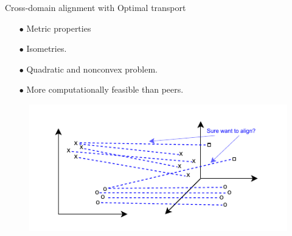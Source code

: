 \documentclass{beamer}
\begin{document}
\begin{frame}{Cross-domain alignment with Optimal transport}
\vspace{-0.3cm}
\begin{minipage}[t]{0.5\linewidth}
\begin{itemize}
  \item[$\bullet$] Metric properties
  \item[$\bullet$] Isometries.
  \item[$\bullet$] Quadratic and nonconvex problem.
  \item[$\bullet$] More computationally feasible than peers.
\end{itemize}
\end{minipage}%
\hfill%
\hspace{-6cm}
\begin{minipage}[t]{0.55\linewidth}
\begin{figure}
  \centering
  \includegraphics[width=1.2\linewidth, keepaspectratio=true]{OT_new/ugw_transition.pdf}
\end{figure}
\end{minipage}

\end{frame}
\end{document}
